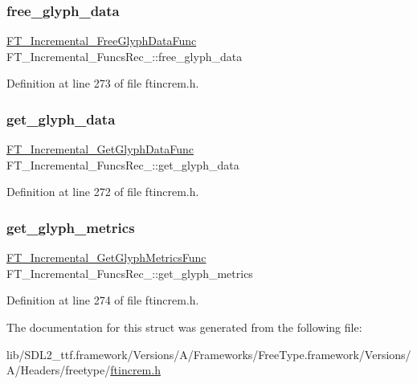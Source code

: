 \subsubsection{\texorpdfstring{free\_glyph\_data}{free\_glyph\_data}}
{\footnotesize\ttfamily \mbox{\hyperlink{ftincrem_8h_a80ee63b054c3ca6ca7cf280071853bd6}{F\+T\+\_\+\+Incremental\+\_\+\+Free\+Glyph\+Data\+Func}} F\+T\+\_\+\+Incremental\+\_\+\+Funcs\+Rec\+\_\+\+::free\+\_\+glyph\+\_\+data}



Definition at line 273 of file ftincrem.\+h.

\mbox{\label{struct_f_t___incremental___funcs_rec___ac276b7ff9624b8d8bf144ab8d00538b4}} 
\subsubsection{\texorpdfstring{get\_glyph\_data}{get\_glyph\_data}}
{\footnotesize\ttfamily \mbox{\hyperlink{ftincrem_8h_ac6b537b5cb4b97b05cae225e24e85720}{F\+T\+\_\+\+Incremental\+\_\+\+Get\+Glyph\+Data\+Func}} F\+T\+\_\+\+Incremental\+\_\+\+Funcs\+Rec\+\_\+\+::get\+\_\+glyph\+\_\+data}



Definition at line 272 of file ftincrem.\+h.

\mbox{\label{struct_f_t___incremental___funcs_rec___ac7d95e85357ab9d1893660b0628c1908}} 
\subsubsection{\texorpdfstring{get\_glyph\_metrics}{get\_glyph\_metrics}}
{\footnotesize\ttfamily \mbox{\hyperlink{ftincrem_8h_a3bd123a916bc132ec44104eab2e52a3f}{F\+T\+\_\+\+Incremental\+\_\+\+Get\+Glyph\+Metrics\+Func}} F\+T\+\_\+\+Incremental\+\_\+\+Funcs\+Rec\+\_\+\+::get\+\_\+glyph\+\_\+metrics}



Definition at line 274 of file ftincrem.\+h.



The documentation for this struct was generated from the following file\+:\begin{DoxyCompactItemize}
\item 
lib/\+S\+D\+L2\+\_\+ttf.\+framework/\+Versions/\+A/\+Frameworks/\+Free\+Type.\+framework/\+Versions/\+A/\+Headers/freetype/\mbox{\hyperlink{ftincrem_8h}{ftincrem.\+h}}\end{DoxyCompactItemize}
